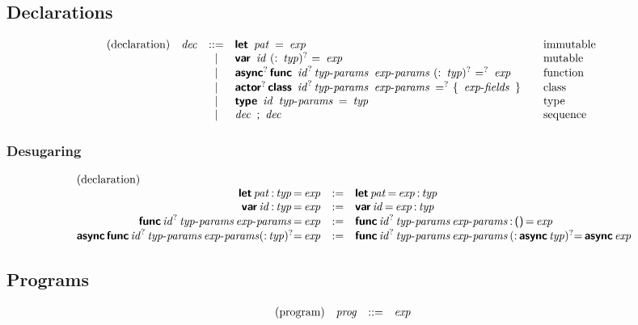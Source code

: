 \subsection*{Declarations}

$$
\begin{array}{@{}lrcl@{\qquad}l}
\text{(declaration)} & \x{dec} &::=&
  \KK{let}~\x{pat}~\K=~\x{exp}
    & \text{immutable} \\&&|&
  \KK{var}~\x{id}~(\K:~\x{typ})^?~\K=~\x{exp}
    & \text{mutable} \\&&|&
  \KK{async}^?\, \KK{func}~\x{id}^? \x{typ-params}~\x{exp-params}~(\K:~\x{typ})^?~\K=^?~\x{exp}
    & \text{function} \\&&|&
  \KK{actor}^?\, \KK{class}~\x{id}^? \x{typ-params}~\x{exp-params}~\K=^?~\K\{~\x{exp-fields}~\K\}
    & \text{class} \\&&|&
  \KK{type}~\x{id}~\x{typ-params}~\K=~\x{typ}
    & \text{type} \\&&|&
  \x{dec}~\K;~\x{dec}
      & \text{sequence} \\
\end{array}
$$

\subsubsection*{Desugaring}

$$
\begin{array}{@{}rcl@{}}
\text{(declaration)} \hfill \\
\KK{let} \x{pat} \K: \x{typ} \K= \x{exp} &:=&
  \KK{let} \x{pat} \K= \x{exp} \K: \x{typ} \\
\KK{var} \x{id} \K: \x{typ} \K= \x{exp} &:=&
  \KK{var} \x{id} \K= \x{exp} \K: \x{typ} \\
\KK{func} \x{id}^? \x{typ-params} \x{exp-params} \K= \x{exp} &:=&
  \KK{func} \x{id}^? \x{typ-params} \x{exp-params} \K: \, \K{()} \, \K= \x{exp} \\
\KK{async} \, \KK{func} \x{id}^? \x{typ-params} \x{exp-params} (\K: \x{typ})^? \K= \x{exp} &:=&
\KK{func} \x{id}^? \x{typ-params} \x{exp-params} \, (\K: \, \KK{async} \x{typ})^? \K= \, \KK{async} \x{exp} \\
\end{array}
$$


\subsection*{Programs}

$$
\begin{array}{@{}lrcl@{\qquad}l}
\text{(program)} & \x{prog} &::=&
  \x{exp}
\end{array}
$$
